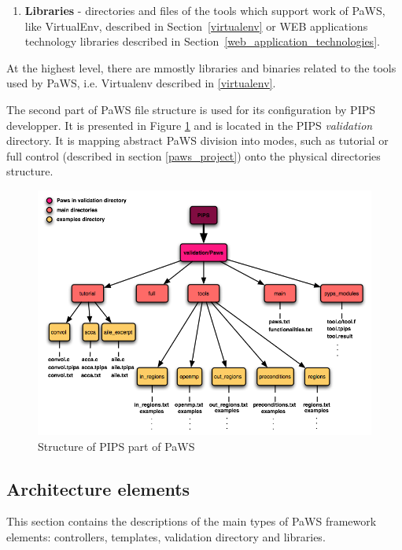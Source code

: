 \begin{enumerate}
  \item {\bf Libraries} - directories and files of the tools which
    support work of PaWS, like VirtualEnv, described in
    Section~\ref{virtualenv} or WEB applications technology
    libraries described in Section~\ref{web_application_technologies}.

\end{enumerate}

At the highest level, there are mmostly libraries and binaries related
to the tools used by PaWS, i.e. Virtualenv described in
\ref{virtualenv}.

The second part of PaWS file structure is used for its configuration
by PIPS developper. It is presented in Figure \ref{fig:pips_structure}
and is located in the PIPS \emph{validation} directory. It is mapping
abstract PaWS division into modes, such as tutorial or full control
(described in section \ref{paws_project}) onto the physical
directories structure.

\begin{figure}[h!]
  \centering
  \includegraphics[width=1.0\textwidth]{reportCh2/pips-structure}
  \caption{Structure of PIPS part of PaWS}
  \label{fig:pips_structure}
\end{figure}

\subsection{Architecture elements}
\label{architecture_elements}

This section contains the descriptions of the main types of PaWS
framework elements: controllers, templates, validation directory and
libraries.

